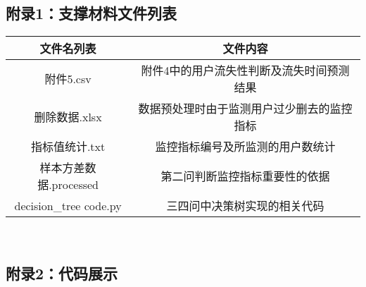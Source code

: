 \documentclass{ctexart}
\begin{document}
        \subsection{附录1：支撑材料文件列表}
        \begin{center}
            \begin{tabular}{|c|c|}
                \hline
                文件名列表&文件内容\\
                \hline
                附件5.csv&附件4中的用户流失性判断及流失时间预测结果\\
                
                删除数据.xlsx&数据预处理时由于监测用户过少删去的监控指标\\
                指标值统计.txt&监控指标编号及所监测的用户数统计\\
                样本方差数据.processed&第二问判断监控指标重要性的依据\\

                decision\_tree code.py&三四问中决策树实现的相关代码\\

    
                \hline
            \end{tabular}\\
        \end{center}

       
        \subsection{附录2：代码展示}
        \begin{flushleft}
        \begin{lstlisting}[caption={数据预处理代码}]


\end{lstlisting}
\end{flushleft}
\end{document}
